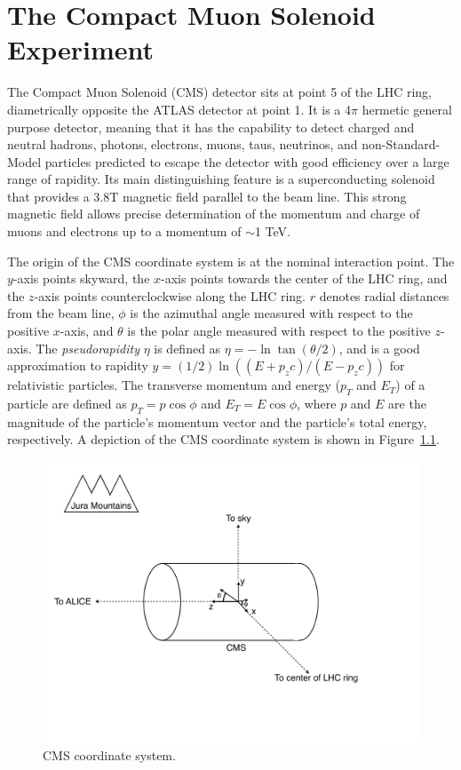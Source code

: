 \documentclass[dissertation.tex]{subfiles}
\begin{document}
\chapter{The Compact Muon Solenoid Experiment}
\label{chap:The Compact Muon Solenoid Experiment}

The Compact Muon Solenoid (CMS) detector sits at point 5 of the LHC ring, diametrically opposite the ATLAS detector at point 1.  It is a 4$\pi$ hermetic general purpose detector, meaning that it has the capability to detect charged and neutral hadrons, photons, electrons, muons, taus, neutrinos, and non-Standard-Model particles predicted to escape the detector with good efficiency over a large range of rapidity.  Its main distinguishing feature is a superconducting solenoid that provides a 3.8T magnetic field parallel to the beam line.  This strong magnetic field allows precise determination of the momentum and charge of muons and electrons up to a momentum of $\sim$1 TeV.

The origin of the CMS coordinate system is at the nominal interaction point.  The $y$-axis points skyward, the $x$-axis points towards the center of the LHC ring, and the $z$-axis points counterclockwise along the LHC ring.  $r$ denotes radial distances from the beam line, $\phi$ is the azimuthal angle measured with respect to the positive $x$-axis, and $\theta$ is the polar angle measured with respect to the positive $z$-axis.  The \textit{pseudorapidity} $\eta$ is defined as $\eta = -\ln\tan(\theta/2)$, and is a good approximation to rapidity $y = (1/2)\ln((E + p_{z}c)/(E - p_{z}c))$ for relativistic particles.  The transverse momentum and energy ($p_{T}$ and $E_{T}$) of a particle are defined as $p_{T} = p\cos\phi$ and $E_{T} = E\cos\phi$, where $p$ and $E$ are the magnitude of the particle's momentum vector and the particle's total energy, respectively.  A depiction of the CMS coordinate system is shown in Figure~\ref{fig:CMS_coordinate_system}.

\begin{figure}
	\centering
	\includegraphics[scale=0.5]{CMS_coordinate_system}
	\caption{CMS coordinate system.}
	\label{fig:CMS_coordinate_system}
\end{figure}
\end{document}
